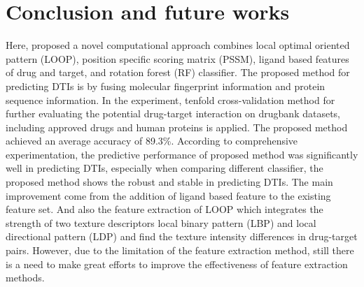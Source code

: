 \documentclass[conference]{IEEEtran}
\begin{document}
\section{Conclusion and future works}
Here, proposed a novel computational approach combines local optimal oriented pattern (LOOP), position specific scoring matrix (PSSM), ligand based features of drug and target, and rotation forest (RF) classifier. The proposed method for predicting DTIs is by fusing molecular fingerprint information and protein sequence information. In the experiment, tenfold cross-validation method for further evaluating the potential drug-target interaction on drugbank datasets, including approved drugs and human proteins is applied. The proposed method achieved an average accuracy of 89.3\%. According to comprehensive experimentation, the predictive performance of proposed method was significantly well in predicting DTIs, especially when comparing different classifier, the proposed method shows the robust and stable in predicting DTIs. The main improvement come from the addition of ligand based feature to the existing feature set. And also the feature extraction of LOOP which integrates the strength of two texture descriptors local binary pattern (LBP) and local directional pattern (LDP) and find the texture intensity differences in drug-target pairs. However, due to the limitation of the feature extraction method, still there is a need to make great efforts to improve the effectiveness of feature extraction methods.
\end{document}
